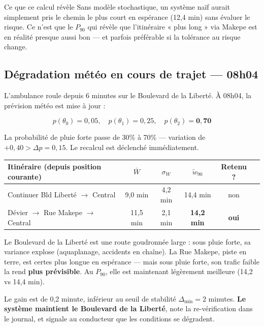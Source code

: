 \documentclass[12pt,a4paper]{article}
\theoremstyle{definition}
\theoremstyle{remark}
\begin{document}
\begin{stormbox}{Ce que ce calcul révèle}
Sans modèle stochastique, un système naïf aurait simplement
pris le chemin le plus court en espérance (12,4 min) sans
évaluer le risque. Ce n'est que le $P_{90}$ qui révèle que
l'itinéraire « plus long » via Makepe est en réalité presque
aussi bon — et parfois préférable si la tolérance au risque
change.
\end{stormbox}

\subsection{Dégradation météo en cours de trajet — 08h04}

L'ambulance roule depuis 6 minutes sur le Boulevard de la Liberté.
À 08h04, la prévision météo est mise à jour :

\[
  p(\theta_0) = 0{,}05, \quad
  p(\theta_1) = 0{,}25, \quad
  p(\theta_2) = \mathbf{0{,}70}
\]

La probabilité de pluie forte passe de 30\% à 70\% — variation de
$+0{,}40 > \Delta p = 0{,}15$. Le recalcul est déclenché
immédiatement.

\medskip
\begin{center}
\begin{tabular}{lccccc}
  \toprule
  \textbf{Itinéraire (depuis position courante)} &
  \textbf{$\bar{W}$} & \textbf{$\sigma_W$} &
  \textbf{$\tilde{w}_{90}$} & \textbf{Retenu ?} \\
  \midrule
  Continuer Bld Liberté $\to$ Central &
    9,0 min & 4,2 min & 14,4 min & non \\
  Dévier $\to$ Rue Makepe $\to$ Central &
    11,5 min & 2,1 min & \textbf{14,2 min} & \textbf{oui} \\
  \bottomrule
\end{tabular}
\end{center}

\medskip
\noindent
Le Boulevard de la Liberté est une route goudronnée large :
sous pluie forte, sa variance explose (aquaplanage, accidents en
chaîne). La Rue Makepe, piste en terre, est certes plus longue en
espérance — mais sous pluie forte, son trafic faible la rend
\textbf{plus prévisible}. Au $P_{90}$, elle est maintenant
légèrement meilleure (14,2 vs 14,4 min).

\medskip
Le gain est de 0,2 minute, inférieur au seuil de stabilité
$\Delta_{\min} = 2$ minutes. \textbf{Le système maintient le Boulevard
de la Liberté}, note la re-vérification dans le journal, et signale
au conducteur que les conditions se dégradent.
\end{document}
